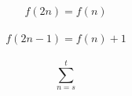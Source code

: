 \documentclass{article}
\begin{document}
$$f(2n) = f(n)$$\\
$$f(2n - 1) = f(n)+1$$\\
$$\sum_{n=s}^t$$\\
\end{document}
